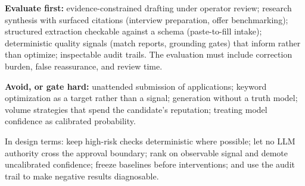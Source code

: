 \documentclass[11pt]{article}
\begin{document}
\textbf{Evaluate first:} evidence-constrained drafting under operator
review; research synthesis with surfaced citations (interview preparation,
offer benchmarking); structured extraction checkable against a schema
(paste-to-fill intake); deterministic quality signals (match reports,
grounding gates) that inform rather than optimize; inspectable audit trails. The
evaluation must include correction burden, false reassurance, and review time.

\textbf{Avoid, or gate hard:} unattended submission of applications;
keyword optimization as a target rather than a signal; generation without a
truth model; volume strategies that spend the candidate's reputation;
treating model confidence as calibrated probability.

In design terms: keep high-risk checks deterministic where possible; let no
LLM authority cross the approval boundary; rank on observable signal and
demote uncalibrated confidence; freeze baselines before interventions; and use
the audit trail to make negative results diagnosable.
\end{document}

